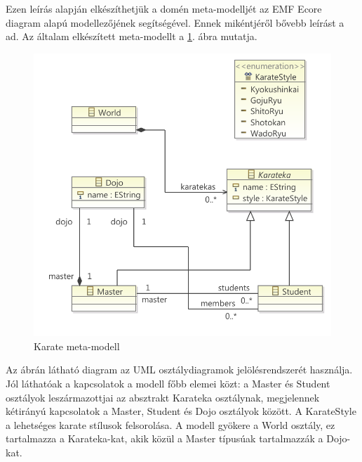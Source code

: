 Ezen leírás alapján elkészíthetjük a domén meta-modelljét az \gls{EMF} Ecore diagram alapú modellezőjének segítségével.
Ennek mikéntjéről bővebb leírást a \cite{VogelEMF} ad.
Az általam elkészített meta-modellt a \ref{fig:karateMetaModel}. ábra mutatja.
%
\begin{figure}[htb]
\centering
\includegraphics[width=\textwidth]{figures/ecore-karate-metamodel-diag.pdf}
\caption{Karate meta-modell}
\label{fig:karateMetaModel}
\end{figure}
%
Az ábrán látható diagram az UML osztálydiagramok jelölésrendszerét használja.
Jól láthatóak a kapcsolatok a modell főbb elemei közt: a Master és Student osztályok leszármazottjai az absztrakt Karateka osztálynak, megjelennek kétirányú kapcsolatok a Master, Student és Dojo osztályok között.
A KarateStyle a lehetséges karate stílusok felsorolása.
A modell gyökere a World osztály, ez tartalmazza a Karateka-kat, akik közül a Master típusúak tartalmazzák a Dojo-kat.

